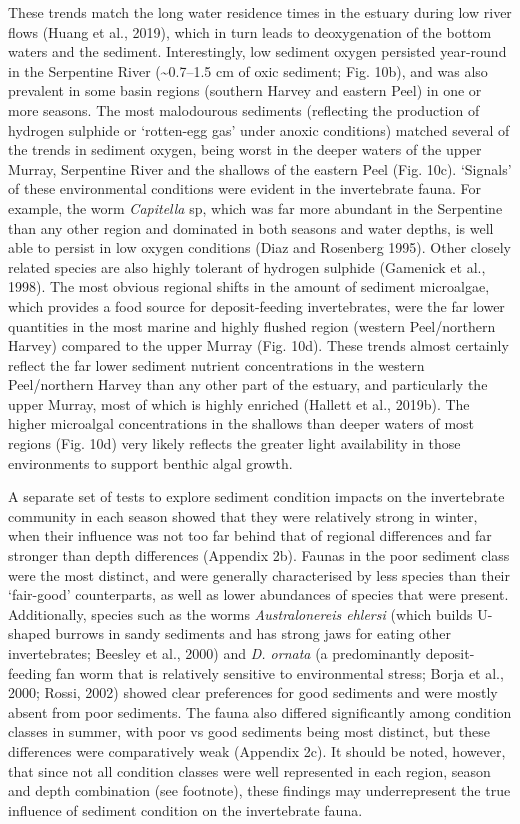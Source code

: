 \documentclass[
]{book}
\begin{document}
These trends match the long water residence times in the estuary during low river flows (Huang et al., 2019), which in turn leads to deoxygenation of the bottom waters and the sediment. Interestingly, low sediment oxygen persisted year-round in the Serpentine River (\textasciitilde0.7--1.5 cm of oxic sediment; Fig. 10b), and was also prevalent in some basin regions (southern Harvey and eastern Peel) in one or more seasons. The most malodourous sediments (reflecting the production of hydrogen sulphide or `rotten-egg gas' under anoxic conditions) matched several of the trends in sediment oxygen, being worst in the deeper waters of the upper Murray, Serpentine River and the shallows of the eastern Peel (Fig. 10c). `Signals' of these environmental conditions were evident in the invertebrate fauna. For example, the worm \emph{Capitella} sp, which was far more abundant in the Serpentine than any other region and dominated in both seasons and water depths, is well able to persist in low oxygen conditions (Diaz and Rosenberg 1995). Other closely related species are also highly tolerant of hydrogen sulphide (Gamenick et al., 1998). The most obvious regional shifts in the amount of sediment microalgae, which provides a food source for deposit-feeding invertebrates, were the far lower quantities in the most marine and highly flushed region (western Peel/northern Harvey) compared to the upper Murray (Fig. 10d). These trends almost certainly reflect the far lower sediment nutrient concentrations in the western Peel/northern Harvey than any other part of the estuary, and particularly the upper Murray, most of which is highly enriched (Hallett et al., 2019b). The higher microalgal concentrations in the shallows than deeper waters of most regions (Fig. 10d) very likely reflects the greater light availability in those environments to support benthic algal growth.

A separate set of tests to explore sediment condition impacts on the invertebrate community in each season showed that they were relatively strong in winter, when their influence was not too far behind that of regional differences and far stronger than depth differences (Appendix 2b). Faunas in the poor sediment class were the most distinct, and were generally characterised by less species than their `fair-good' counterparts, as well as lower abundances of species that were present. Additionally, species such as the worms \emph{Australonereis ehlersi} (which builds U-shaped burrows in sandy sediments and has strong jaws for eating other invertebrates; Beesley et al., 2000) and \emph{D. ornata} (a predominantly deposit-feeding fan worm that is relatively sensitive to environmental stress; Borja et al., 2000; Rossi, 2002) showed clear preferences for good sediments and were mostly absent from poor sediments. The fauna also differed significantly among condition classes in summer, with poor vs good sediments being most distinct, but these differences were comparatively weak (Appendix 2c). It should be noted, however, that since not all condition classes were well represented in each region, season and depth combination (see footnote), these findings may underrepresent the true influence of sediment condition on the invertebrate fauna.~
\end{document}
